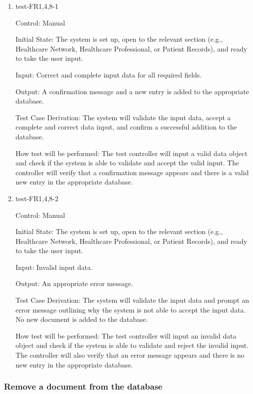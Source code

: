 \documentclass[12pt, titlepage]{article}
\begin{document}
\begin{enumerate}

\item{test-FR1,4,8-1} \label{test-FR1,4,8-1}

Control: Manual

Initial State: The system is set up, open to the relevant section (e.g., Healthcare Network, Healthcare Professional, or Patient Records), and ready to take the user input.

Input: Correct and complete input data for all required fields.

Output: A confirmation message and a new entry is added to the appropriate database.

Test Case Derivation: The system will validate the input data, accept a complete and correct data input, and confirm a successful addition to the database.

How test will be performed: The test controller will input a valid data object and check if the system is able to validate and accept the valid input. The controller will verify that a confirmation message appears and there is a valid new entry in the appropriate database.

					
\item{test-FR1,4,8-2} \label{test-FR1,4,8-2}

Control: Manual
					
Initial State: The system is set up, open to the relevant section (e.g., Healthcare Network, Healthcare Professional, or Patient Records), and ready to take the user input.

Input: Invalid input data.

Output: An appropriate error message.

Test Case Derivation: The system will validate the input data and prompt an error message outlining why the system is not able to accept the input data. No new document is added to the database.

How test will be performed: The test controller will input an invalid data object and check if the system is able to validate and reject the invalid input. The controller will also verify that an error message appears and there is no new entry in the appropriate database.

\end{enumerate}


\subsubsection{Remove a document from the database} \label{section:4.1.2}
\end{document}
